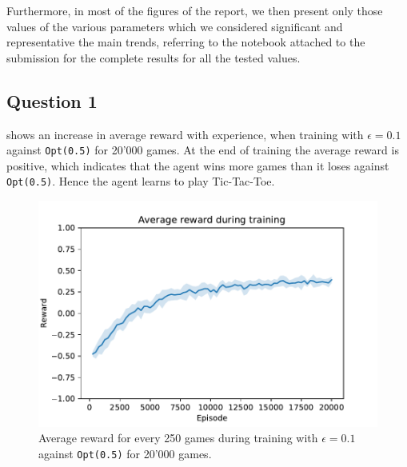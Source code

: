 \documentclass[10pt]{IEEEtran}
\begin{document}
Furthermore, in most of the figures of the report, we then present only those values of the various parameters which we considered significant and representative the main trends, referring to the notebook attached to the submission for the complete results for all the tested values.

\subsection*{Question 1}
 shows an increase in average reward with experience, when training with $\epsilon = 0.1$ against \texttt{Opt(0.5)} for 20'000 games. At the end of training the average reward is positive, which indicates that the agent wins more games than it loses against \texttt{Opt(0.5)}. Hence the agent learns to play Tic-Tac-Toe.
\begin{figure}[h]
    \centering
    \includegraphics[width = 0.85\linewidth]{code/figures/rewards_Q1.pdf}
    \caption{Average reward for every 250 games during training with $\epsilon = 0.1$ against \texttt{Opt(0.5)} for 20'000 games.}
    \label{plot_question1}
\end{figure}
\end{document}
